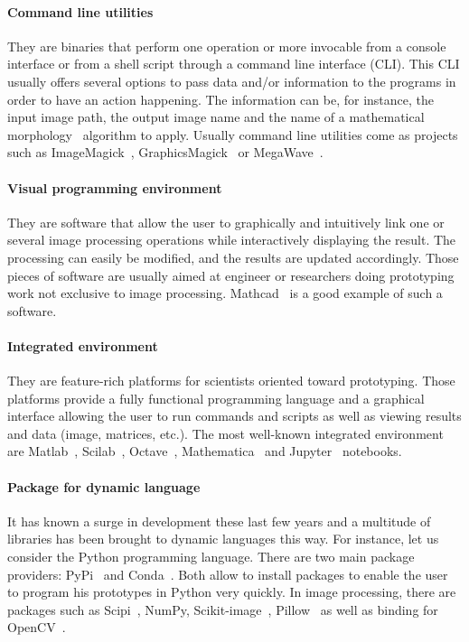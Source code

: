\paragraph{Command line utilities} They are binaries that perform one operation or more invocable from a console
interface or from a shell script through a command line interface (CLI). This CLI usually offers several options to pass
data and/or information to the programs in order to have an action happening. The information can be, for instance, the
input image path, the output image name and the name of a mathematical
morphology~\parencite{najman.2013.mathematical,geraud.2010.book} algorithm to apply. Usually command line utilities come
as projects such as ImageMagick~\parencite{imagemagick.2021}, GraphicsMagick~\parencite{graphicsmagick.2021} or
MegaWave~\parencite{froment.2012.megawave,froment.2004.megawave2}.

\paragraph{Visual programming environment} They are software that allow the user to graphically and intuitively link one
or several image processing operations while interactively displaying the result. The processing can easily be modified,
and the results are updated accordingly. Those pieces of software are usually aimed at engineer or researchers doing
prototyping work not exclusive to image processing. Mathcad~\parencite{ptc.2019.mathcad} is a good example of such a
software.

\paragraph{Integrated environment} They are feature-rich platforms for scientists oriented toward prototyping. Those
platforms provide a fully functional programming language and a graphical interface allowing the user to run commands
and scripts as well as viewing results and data (image, matrices, etc.). The most well-known integrated environment
are Matlab~\parencite{mathworks.2020.matlab}, Scilab~\parencite{scilab.2020}, Octave~\parencite{gnu.2021.octave},
Mathematica~\parencite{wolfram.2020.mathematica} and Jupyter~\parencite{kluyver.2016.jupyter} notebooks.

\paragraph{Package for dynamic language} It has known a surge in development these last few years and a multitude of
libraries has been brought to dynamic languages this way. For instance, let us consider the Python programming language.
There are two main package providers: PyPi~\parencite{pypi.2021} and Conda~\parencite{anaconda.2020}. Both allow to
install packages to enable the user to program his prototypes in Python very quickly. In image processing, there are
packages such as Scipi~\parencite{jones.2006.scipy}, NumPy, Scikit-image~\parencite{vanderwalt.2014.skimage},
Pillow~\parencite{clark.2021.pillow} as well as binding for OpenCV~\parencite{bradski.2000.opencv}.

